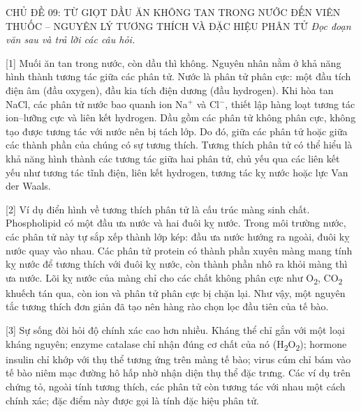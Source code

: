 \documentclass[12pt,a4paper,twoside]{article}
\newcounter{qcounter}
\newenvironment{readingpassage}[1][]{%
    \begin{tcolorbox}[enhanced, colback=grayLight, colframe=secondaryBlue,
        coltitle=textDark, fonttitle=\bfseries, title={#1},
        rounded corners, arc=3mm, boxrule=1pt,
        left=15pt, right=15pt, top=10pt, bottom=10pt,
        breakable, before skip=10pt, after skip=10pt, drop fuzzy shadow]
    \setstretch{1.3}
}{\end{tcolorbox}}
\begin{document}
\newpage
\setcounter{qcounter}{0}

\label{b1_cd09}
\begin{topicbox}{\large CHỦ ĐỀ 09: TỪ GIỌT DẦU ĂN KHÔNG TAN TRONG NƯỚC ĐẾN VIÊN THUỐC -- NGUYÊN LÝ TƯƠNG THÍCH VÀ ĐẶC HIỆU PHÂN TỬ}
\vspace{8pt}
\textit{Đọc đoạn văn sau và trả lời các câu hỏi.}
\end{topicbox}
\vspace{5pt}
\begin{readingpassage}[]


[1] Muối ăn tan trong nước, còn dầu thì không. Nguyên nhân nằm ở khả năng hình thành tương tác giữa các phân tử. Nước là phân tử phân cực: một đầu tích điện âm (đầu oxygen), đầu kia tích điện dương (đầu hydrogen). Khi hòa tan NaCl, các phân tử nước bao quanh ion Na$^+$ và Cl$^-$, thiết lập hàng loạt tương tác ion--lưỡng cực và liên kết hydrogen. Dầu gồm các phân tử không phân cực, không tạo được tương tác với nước nên bị tách lớp. Do đó, giữa các phân tử hoặc giữa các thành phần của chúng có sự tương thích. Tương thích phân tử có thể hiểu là khả năng hình thành các tương tác giữa hai phân tử, chủ yếu qua các liên kết yếu như tương tác tĩnh điện, liên kết hydrogen, tương tác kỵ nước hoặc lực Van der Waals.

[2] Ví dụ điển hình về tương thích phân tử là cấu trúc màng sinh chất. Phospholipid có một đầu ưa nước và hai đuôi kỵ nước. Trong môi trường nước, các phân tử này tự sắp xếp thành lớp kép: đầu ưa nước hướng ra ngoài, đuôi kỵ nước quay vào nhau. Các phân tử protein có thành phần xuyên màng mang tính kỵ nước để tương thích với đuôi kỵ nước, còn thành phần nhô ra khỏi màng thì ưa nước. Lõi kỵ nước của màng chỉ cho các chất không phân cực như O\textsubscript{2}, CO\textsubscript{2} khuếch tán qua, còn ion và phân tử phân cực bị chặn lại. Như vậy, một nguyên tắc tương thích đơn giản đã tạo nên hàng rào chọn lọc đầu tiên của tế bào.

[3] Sự sống đòi hỏi độ chính xác cao hơn nhiều. Kháng thể chỉ gắn với một loại kháng nguyên; enzyme catalase chỉ nhận đúng cơ chất của nó (H\textsubscript{2}O\textsubscript{2}); hormone insulin chỉ khớp với thụ thể tương ứng trên màng tế bào; virus cúm chỉ bám vào tế bào niêm mạc đường hô hấp nhờ nhận diện thụ thể đặc trưng. Các ví dụ trên chứng tỏ, ngoài tính tương thích, các phân tử còn tương tác với nhau một cách chính xác; đặc điểm này được gọi là tính đặc hiệu phân tử.


\end{readingpassage}
\end{document}
